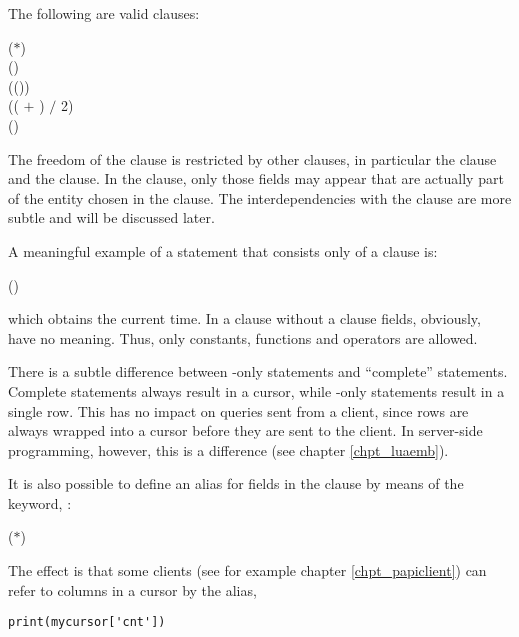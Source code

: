 The following are valid  clauses:

 ($\ast$) \\
 () \\
 (()) \\
 (( $+$
                                   ) $/$ 2) \\
 ()

The freedom of the  clause
is restricted by other clauses, in particular
the  clause and the  clause.
In the  clause, only
those fields may appear that are actually
part of the entity chosen in the  clause.
The interdependencies with the  clause
are more subtle and will be discussed later.

A meaningful example of a  statement
that consists only of a  clause is:

 ()

which obtains the current time.
In a  clause without a  clause
fields, obviously, have no meaning.
Thus, only constants, functions
and operators are allowed.

There is a subtle difference between -only
statements and ``complete''  statements.
Complete  statements always result in a
cursor, while -only statements result
in a single row. This has no impact on queries sent
from a client, since rows are always wrapped into
a cursor before they are sent to the client.
In server-side programming, however, this is a difference
(see chapter \ref{chpt_luaemb}).

It is also possible to define an alias for fields
in the  clause by means of
the  keyword, \eg:

 ($\ast$)  

The effect is that some clients
(see for example chapter \ref{chpt_papiclient})
can refer to columns in a cursor by the alias,
\eg\

\begin{python}
\begin{lstlisting}
print(mycursor['cnt'])
\end{lstlisting}
\end{python}

